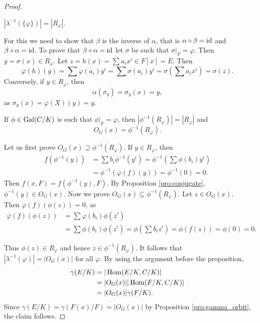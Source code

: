 \begin{proof}
    \begin{claim}
        $|\lambda^{-1}(\{\varphi\})|=|R_\varphi|$. 
    \end{claim}
    
    For this we need to show that $\beta$ is
    the inverse of $\alpha$, that is 
    $\alpha\circ\beta=\operatorname{id}$ and $\beta\circ\alpha=\operatorname{id}$. 
    To prove that $\beta\circ\alpha=\operatorname{id}$ 
    let $\sigma$ be such that $\sigma|_F=\varphi$. 
    Then $y=\sigma(x)\in R_\varphi$. Let
    $z=h(x)=\sum a_ix^i\in F[x]=E$. Then  
    \[
    \overline{\varphi}(h)(y)=\sum\varphi(a_i)y^i=\sum\sigma(a_i)y^i
    =\sigma\left(\sum a_ix^i\right)=\sigma(z).
    \]
    Conversely, if $y\in R_\varphi$, then
    \[
    \alpha(\sigma_y)=\sigma_y(x)=y,
    \]
    as $\sigma_y(x)=\overline{\varphi}(X)(y)=y$.
    
    \begin{claim}
        If $\phi\in\operatorname{Gal}(C/K)$ is such that $\phi|_F=\varphi$, then 
        $|\phi^{-1}(R_\varphi)|=|R_{\varphi}|$ and 
        \[
        O_{G}(x)=\phi^{-1}(R_\varphi).
        \]
    \end{claim}

    Let us first prove $O_{G}(x)\supseteq \phi^{-1}(R_\varphi)$.
    If $y\in R_{\varphi}$, 
    then 
    \begin{align*}
    f(\phi^{-1}(y))&=\sum b_i\phi^{-1}(y^i)=\phi^{-1}\left(\sum\phi(b_i)y^i\right)\\
&=\phi^{-1}(\overline{\varphi}(f)(y))=\phi^{-1}(0)=0.
    \end{align*}
    Then $f(x,F)=f(\phi^{-1}(y),F)$. By Proposition \ref{pro:conjugate}, $\phi^{-1}(y)\in O_G(x)$. 
    Now we prove $O_{G}(x)\subseteq\phi^{-1}(R_\varphi)$.
    Let $z\in O_{G}(x)$. Then $\overline{\varphi}(f)(\phi(z))=0$, as
    \begin{align*}
    \overline{\varphi}(f)(\phi(z))&=\sum\varphi(b_i)\phi(z^i)\\
    &=\sum\phi(b_i)\phi(z^i)
    =\phi\left(\sum b_iz^i\right)
    =\phi(f(z))=\phi(0)=0.
    \end{align*}
    
    \medskip
    Thus $\phi(z)\in R_{\varphi}$ and hence $z\in\phi^{-1}(R_{\varphi})$. 
    It follows that $|\lambda^{-1}(\varphi)|=|O_{G}(x)|$ for
    all $\varphi$. By using the argument
    before the proposition, 
    \begin{align*}
    \gamma(E/K)&=|\operatorname{Hom}(E/K,C/K)|\\
        &=|O_{G}(x)||\operatorname{Hom}(F/K,C/K)|\\
        &=|O_{G}(x)|\gamma(F/K).
    \end{align*}
    Since $\gamma(E/K)=\gamma(F(x)/F)=|O_{G}(x)|$ by Proposition \ref{pro:gamma_orbit}, the claim follows. 
    

\end{proof}
